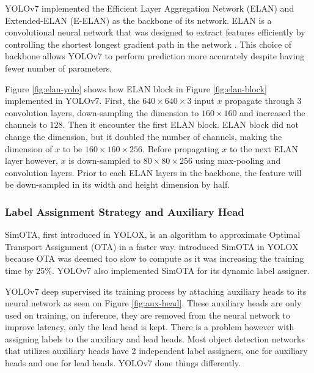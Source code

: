 
  YOLOv7 implemented the Efficient Layer Aggregation Network (ELAN) and Extended-ELAN (E-ELAN) as the backbone of its network. 
  ELAN is a convolutional neural network that was designed to extract features efficiently 
  by controlling the shortest longest gradient path in the network \parencite{elan}.
  This choice of backbone allows YOLOv7 to perform prediction more accurately despite having fewer number of parameters. 

  Figure \ref{fig:elan-yolo} shows how ELAN block in Figure \ref{fig:elan-block} implemented in YOLOv7.
  First, the $640\times 640\times 3$ input $x$ propagate through 3 convolution layers, down-sampling the dimension to $160\times 160$ and increased the channels to $128$.
  Then it encounter the first ELAN block. ELAN block did not change the dimension, but it doubled the number of channels, making the dimension of $x$ to be $160\times 160\times 256$.
  Before propagating $x$ to the next ELAN layer however, $x$ is down-sampled to $80\times 80\times 256$ using max-pooling and convolution layers. 
  Prior to each ELAN layers in the backbone, the feature will be down-sampled in its width and height dimension by half.

  \subsubsection{Label Assignment Strategy and Auxiliary Head}

  SimOTA, first introduced in YOLOX, is an algorithm to approximate Optimal Transport Assignment (OTA)
  in a faster way. \textcite{yolox} introduced SimOTA in YOLOX because OTA was deemed too slow to compute
  as it was increasing the training time by 25\%. YOLOv7 also implemented SimOTA for its dynamic label assigner.

  YOLOv7 deep supervised its training process by attaching auxiliary heads to its neural network
  as seen on Figure \ref{fig:aux-head}.
  These auxiliary heads are only used on training, on inference, they are removed from the neural network
  to improve latency, only the lead head is kept. There is a problem however with assigning labels
  to the auxiliary and lead heads. Most object detection networks that utilizes auxiliary heads have 2
  independent label assigners, one for auxiliary heads and one for lead heads. YOLOv7 done things differently.


